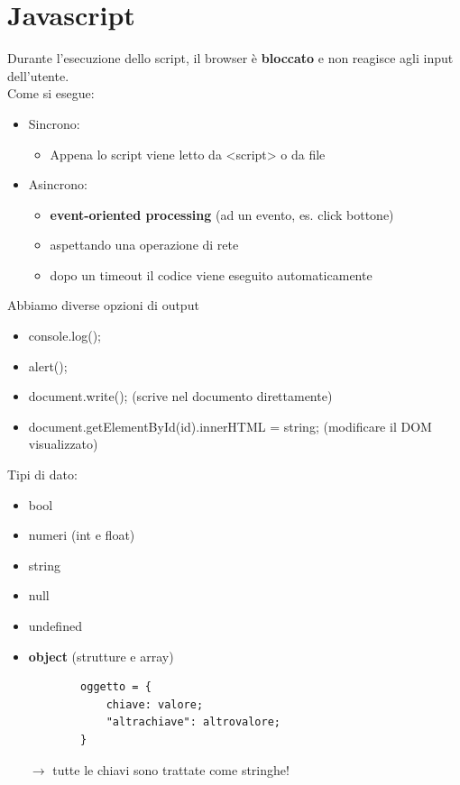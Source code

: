 \documentclass[a4paper,12pt]{article}
\begin{document}
\section{Javascript}
Durante l'esecuzione dello script, il browser è \textbf{bloccato} e non reagisce agli input dell'utente. \\
Come si esegue:
\begin{itemize}
    \item Sincrono:
    \begin{itemize}
        \item Appena lo script viene letto da <script> o da file
    \end{itemize}
    \item Asincrono:
    \begin{itemize}
        \item \textbf{event-oriented processing} (ad un evento, es. click bottone)
        \item aspettando una operazione di rete
        \item dopo un timeout il codice viene eseguito automaticamente
    \end{itemize}
\end{itemize}
Abbiamo diverse opzioni di output
\begin{itemize}
    \item console.log();
    \item alert();
    \item document.write(); (scrive nel documento direttamente)
    \item document.getElementById(id).innerHTML = string; (modificare il DOM visualizzato)
\end{itemize}
Tipi di dato:
\begin{itemize}
    \item bool
    \item numeri (int e float)
    \item string
    \item null
    \item undefined
    \item \textbf{object} (strutture e array)
    \begin{lstlisting}
        oggetto = {
            chiave: valore;
            "altrachiave": altrovalore;
        }
    \end{lstlisting}
    $\to$ tutte le chiavi sono trattate come stringhe!
\end{itemize}
\end{document}
